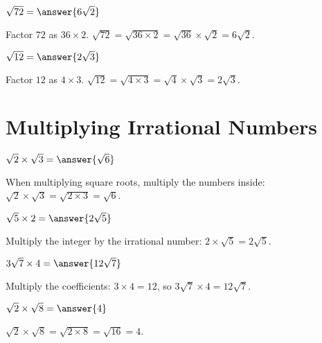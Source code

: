 \documentclass{ximera}
\begin{document}
\begin{problem}
$\sqrt{72} = \answer{6\sqrt{2}}$

\begin{feedback}
Factor $72$ as $36 \times 2$. $\sqrt{72} = \sqrt{36 \times 2} = \sqrt{36} \times \sqrt{2} = 6\sqrt{2}$.
\end{feedback}
\end{problem}

\begin{problem}
$\sqrt{12} = \answer{2\sqrt{3}}$

\begin{feedback}
Factor $12$ as $4 \times 3$. $\sqrt{12} = \sqrt{4 \times 3} = \sqrt{4} \times \sqrt{3} = 2\sqrt{3}$.
\end{feedback}
\end{problem}

\section*{Multiplying Irrational Numbers}

\begin{problem}
$\sqrt{2} \times \sqrt{3} = \answer{\sqrt{6}}$

\begin{feedback}
When multiplying square roots, multiply the numbers inside: $\sqrt{2} \times \sqrt{3} = \sqrt{2 \times 3} = \sqrt{6}$.
\end{feedback}
\end{problem}

\begin{problem}
$\sqrt{5} \times 2 = \answer{2\sqrt{5}}$

\begin{feedback}
Multiply the integer by the irrational number: $2 \times \sqrt{5} = 2\sqrt{5}$.
\end{feedback}
\end{problem}

\begin{problem}
$3\sqrt{7} \times 4 = \answer{12\sqrt{7}}$

\begin{feedback}
Multiply the coefficients: $3 \times 4 = 12$, so $3\sqrt{7} \times 4 = 12\sqrt{7}$.
\end{feedback}
\end{problem}

\begin{problem}
$\sqrt{2} \times \sqrt{8} = \answer{4}$

\begin{feedback}
$\sqrt{2} \times \sqrt{8} = \sqrt{2 \times 8} = \sqrt{16} = 4$.
\end{feedback}
\end{problem}
\end{document}

